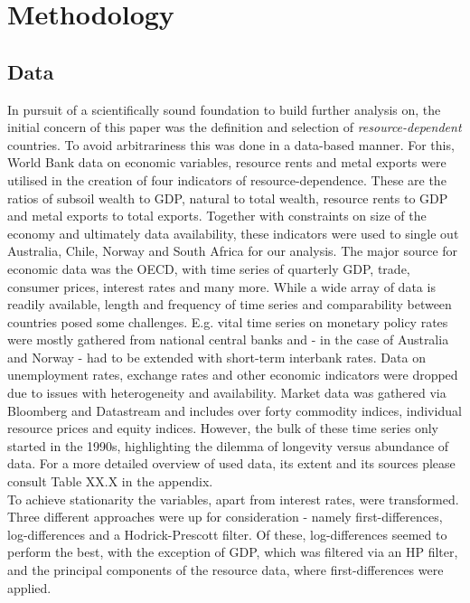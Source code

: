 \documentclass[12pt,]{article}
\begin{document}
\section{Methodology}\label{methodology}

\subsection{Data}\label{data}

In pursuit of a scientifically sound foundation to build further
analysis on, the initial concern of this paper was the definition and
selection of \emph{resource-dependent} countries. To avoid arbitrariness
this was done in a data-based manner. For this, World Bank data on
economic variables, resource rents and metal exports were utilised in
the creation of four indicators of resource-dependence. These are the
ratios of subsoil wealth to GDP, natural to total wealth, resource rents
to GDP and metal exports to total exports. Together with constraints on
size of the economy and ultimately data availability, these indicators
were used to single out Australia, Chile, Norway and South Africa for
our analysis. The major source for economic data was the OECD, with time
series of quarterly GDP, trade, consumer prices, interest rates and many
more. While a wide array of data is readily available, length and
frequency of time series and comparability between countries posed some
challenges. E.g. vital time series on monetary policy rates were mostly
gathered from national central banks and - in the case of Australia and
Norway - had to be extended with short-term interbank rates. Data on
unemployment rates, exchange rates and other economic indicators were
dropped due to issues with heterogeneity and availability. Market data
was gathered via Bloomberg and Datastream and includes over forty
commodity indices, individual resource prices and equity indices.
However, the bulk of these time series only started in the 1990s,
highlighting the dilemma of longevity versus abundance of data. For a
more detailed overview of used data, its extent and its sources please
consult Table XX.X in the appendix.\\
To achieve stationarity the variables, apart from interest rates, were
transformed. Three different approaches were up for consideration -
namely first-differences, log-differences and a Hodrick-Prescott filter.
Of these, log-differences seemed to perform the best, with the exception
of GDP, which was filtered via an HP filter, and the principal
components of the resource data, where first-differences were applied.
\end{document}
